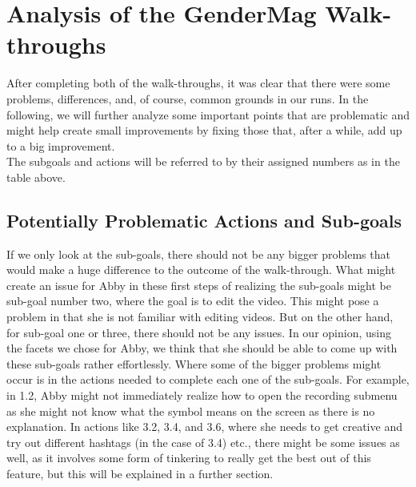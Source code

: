 \documentclass[12pt, letterpaper]{article}
\begin{document}
\section{Analysis of the GenderMag Walk-throughs}
After completing both of the walk-throughs, it was clear that there were some problems, differences, and, of course, common grounds in our runs. In the following, we will further analyze some important points that are problematic and might help create small improvements by fixing those that, after a while, add up to a big improvement.\\
The subgoals and actions will be referred to by their assigned numbers as in the table above.

\subsection{Potentially Problematic Actions and Sub-goals}
If we only look at the sub-goals, there should not be any bigger problems that would make a huge difference to the outcome of the walk-through. What might create an issue for Abby in these first steps of realizing the sub-goals might be sub-goal number two, where the goal is to edit the video. This might pose a problem in that she is not familiar with editing videos. But on the other hand, for sub-goal one or three, there should not be any issues. In our opinion, using the facets we chose for Abby, we think that she should be able to come up with these sub-goals rather effortlessly.
Where some of the bigger problems might occur is in the actions needed to complete each one of the sub-goals. For example, in 1.2, Abby might not immediately realize how to open the recording submenu as she might not know what the symbol means on the screen as there is no explanation. In actions like 3.2, 3.4, and 3.6, where she needs to get creative and try out different hashtags (in the case of 3.4) etc., there might be some issues as well, as it involves some form of tinkering to really get the best out of this feature, but this will be explained in a further section.
\end{document}
